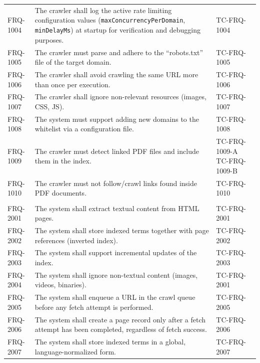 \documentclass{article}
\begin{document}
\begin{longtable}{@{}p{1.7cm} p{9cm} p{4.5cm}@{}}
FRQ-1004 & The crawler shall log the active rate limiting configuration values (\texttt{maxConcurrencyPerDomain}, \texttt{minDelayMs}) at startup for verification and debugging purposes. & TC-FRQ-1004 \\
FRQ-1005 & The crawler must parse and adhere to the ``robots.txt'' file of the target domain. & TC-FRQ-1005 \\


FRQ-1006 & The crawler shall avoid crawling the same URL more than once per execution. & TC-FRQ-1006 \\

FRQ-1007 & The crawler shall ignore non-relevant resources (images, CSS, JS). & TC-FRQ-1007\\

FRQ-1008 & The system must support adding new domains to the whitelist via a configuration file. & TC-FRQ-1008\\

FRQ-1009 & The crawler must detect linked PDF files and include them in the index. & TC-FRQ-1009-A \newline TC-FRQ-1009-B \\

FRQ-1010 & The crawler must not follow/crawl links found inside PDF documents. & TC-FRQ-1010\\
\newpage


\midrule
\multicolumn{3}{l}{\textbf{\textit{Indexing (2000 Series)}}} \\
\midrule
FRQ-2001 & The system shall extract textual content from HTML pages. & TC-FRQ-2001\\
FRQ-2002 & The system shall store indexed terms together with page references (inverted index). & TC-FRQ-2002\\
FRQ-2003 & The system shall support incremental updates of the index. & TC-FRQ-2003 \\
FRQ-2004 & The system shall ignore non-textual content (images, videos, binaries). & TC-FRQ-2001 \\
FRQ-2005 & The system shall enqueue a URL in the crawl queue before any fetch attempt is performed. & TC-FRQ-2005 \\
FRQ-2006 & The system shall create a page record only after a fetch attempt has been completed, regardless of fetch success. & TC-FRQ-2006 \\
FRQ-2007 & The system shall store indexed terms in a global, language-normalized form. & TC-FRQ-2007 \\


\end{longtable}
\end{document}
